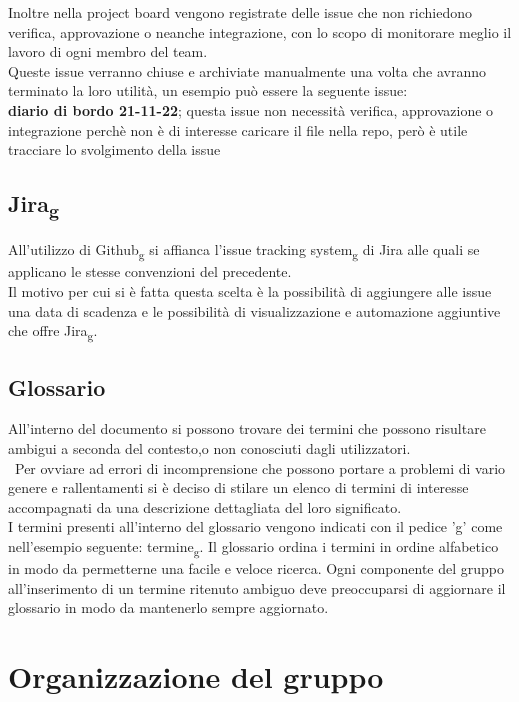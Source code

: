 Inoltre nella project board vengono registrate delle issue che non richiedono verifica, approvazione o neanche integrazione, con lo scopo di monitorare meglio il lavoro di ogni membro del team.\\
Queste issue verranno chiuse e archiviate manualmente una volta che avranno terminato la loro utilità, un esempio può essere la seguente issue:\\
\textbf{diario di bordo 21-11-22}; questa issue non necessità verifica, approvazione o integrazione perchè non è di interesse caricare il file nella repo, però è utile tracciare lo svolgimento della issue

\subsection{Jira\textsubscript{g}}
All'utilizzo di Github\textsubscript{g} si affianca l'issue tracking system\textsubscript{g} di Jira alle quali se applicano le stesse convenzioni del precedente.\\
Il motivo per cui si è fatta questa scelta è la possibilità di aggiungere alle issue una data di scadenza e le possibilità di visualizzazione e automazione aggiuntive che offre Jira\textsubscript{g}.


\subsection{Glossario}
All'interno del documento si possono trovare dei termini che possono risultare ambigui a seconda del contesto,o non conosciuti dagli utilizzatori.\\\
Per ovviare ad errori di incomprensione che possono portare a problemi di vario genere e rallentamenti si è deciso di stilare un elenco di termini 
di interesse accompagnati da una descrizione dettagliata del loro significato.\\
I termini presenti all'interno del glossario vengono indicati con il pedice 'g' come nell'esempio seguente: termine\textsubscript{g}.
Il glossario ordina i termini in ordine alfabetico in modo da permetterne una facile e veloce ricerca.
Ogni componente del gruppo all'inserimento di un termine ritenuto ambiguo deve preoccuparsi di aggiornare il glossario in modo da mantenerlo sempre aggiornato.

\section{Organizzazione del gruppo}
